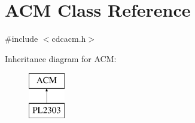 \hypertarget{class_a_c_m}{\section{\-A\-C\-M \-Class \-Reference}
\label{class_a_c_m}
}


{\ttfamily \#include $<$cdcacm.\-h$>$}

\-Inheritance diagram for \-A\-C\-M\-:\begin{figure}[H]
\begin{center}
\leavevmode
\includegraphics[height=2.000000cm]{class_a_c_m}
\end{center}
\end{figure}
